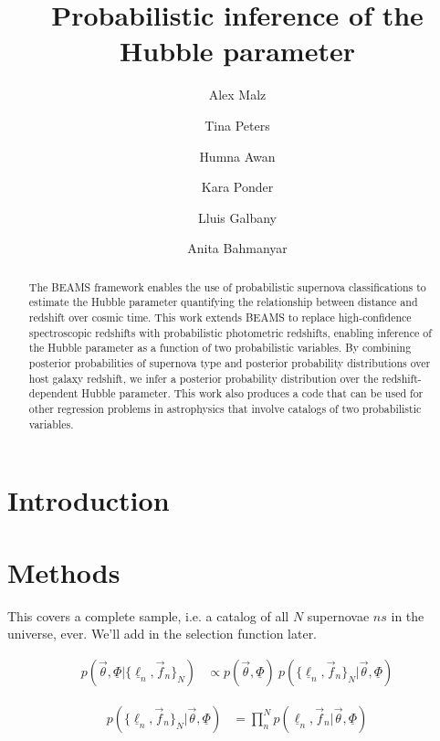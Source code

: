 \documentclass[12pt, onecolumn]{emulateapj}
\newcommand{\textul}{\underline}
\begin{document}
\title{Probabilistic inference of the Hubble parameter}

\author{Alex Malz}
\author{Tina Peters}
\author{Humna Awan}
\author{Kara Ponder}
\author{Lluis Galbany}
\author{Anita Bahmanyar}

\begin{abstract}
The BEAMS framework enables the use of probabilistic supernova classifications to estimate the Hubble parameter quantifying the relationship between distance and redshift over cosmic time.  This work extends BEAMS to replace high-confidence spectroscopic redshifts with probabilistic photometric redshifts, enabling inference of the Hubble parameter as a function of two probabilistic variables.  By combining posterior probabilities of supernova type and posterior probability distributions over host galaxy redshift, we infer a posterior probability distribution over the redshift-dependent Hubble parameter.  This work also produces a code that can be used for other regression problems in astrophysics that involve catalogs of two probabilistic variables.
\end{abstract}

\keywords{}

\section{Introduction}
\label{sec:intro}

\citet{Kelly2008}

\section{Methods}
\label{sec:meth}

This covers a complete sample, i.e. a catalog of all $N$ supernovae $ns$ in the universe, ever.  We'll add in the selection function later.

\begin{align}
p(\vec{\theta}, \textul{\Phi} | \{\textul{\ell}_{n}, \vec{f}_{n}\}_{N}) &\propto p(\vec{\theta}, \textul{\Phi})\ p(\{\textul{\ell}_{n}, \vec{f}_{n}\}_{N} | \vec{\theta}, \textul{\Phi})
\end{align}

\begin{align}
p(\{\textul{\ell}_{n}, \vec{f}_{n}\}_{N} | \vec{\theta}, \textul{\Phi}) &= \prod_{n}^{N}p(\textul{\ell}_{n}, \vec{f}_{n} | \vec{\theta}, \textul{\Phi})
\end{align}
\end{document}
